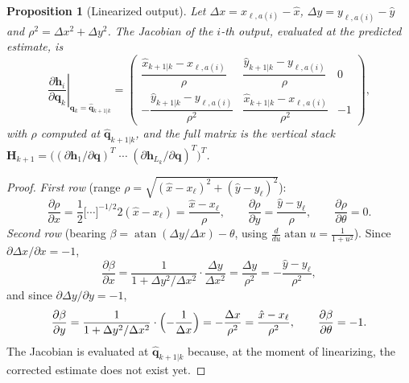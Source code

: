 \documentclass[11pt,a4paper]{article}
\theoremstyle{definition}
\theoremstyle{plain}
\newtheorem{proposition}[definition]{Proposition}
\theoremstyle{remark}
\newcommand{\hq}{\hat{\bm q}}
\begin{document}
\begin{proposition}[Linearized output]
\label{prop:H}
Let $\Delta x=x_{\ell,a(i)}-\hat x$, $\Delta y=y_{\ell,a(i)}-\hat y$ and $\rho^2=\Delta x^2+\Delta y^2$. The Jacobian of the $i$-th output, evaluated at the \emph{predicted} estimate, is
\[
\left.\frac{\partial\bm h_i}{\partial\bm q_k}\right|_{\bm q_k=\hq_{k+1|k}}=
\begin{pmatrix}
\dfrac{\hat x_{k+1|k}-x_{\ell,a(i)}}{\rho} & \dfrac{\hat y_{k+1|k}-y_{\ell,a(i)}}{\rho} & 0\\[10pt]
-\dfrac{\hat y_{k+1|k}-y_{\ell,a(i)}}{\rho^2} & \dfrac{\hat x_{k+1|k}-x_{\ell,a(i)}}{\rho^2} & -1
\end{pmatrix},
\]
with $\rho$ computed at $\hq_{k+1|k}$, and the full matrix is the vertical stack
$\bm H_{k+1}=\bigl((\partial\bm h_1/\partial\bm q)^T\;\cdots\;(\partial\bm h_{L_k}/\partial\bm q)^T\bigr)^T$.
\end{proposition}
\begin{proof}
\emph{First row} (range $\rho=\sqrt{(\hat x-x_\ell)^2+(\hat y-y_\ell)^2}$):
\[
\frac{\partial\rho}{\partial x}=\frac12\bigl[\cdots\bigr]^{-1/2}2(\hat x-x_\ell)=\frac{\hat x-x_\ell}{\rho},\qquad
\frac{\partial\rho}{\partial y}=\frac{\hat y-y_\ell}{\rho},\qquad
\frac{\partial\rho}{\partial\theta}=0 .
\]
\emph{Second row} (bearing $\beta=\operatorname{atan}(\Delta y/\Delta x)-\theta$, using $\tfrac{d}{du}\operatorname{atan}u=\tfrac1{1+u^2}$). Since $\partial\Delta x/\partial x=-1$,
\[
\frac{\partial\beta}{\partial x}=\frac{1}{1+\Delta y^2/\Delta x^2}\cdot\frac{\Delta y}{\Delta x^2}=\frac{\Delta y}{\rho^2}=-\frac{\hat y-y_\ell}{\rho^2},
\]
and since $\partial\Delta y/\partial y=-1$,
\[
\frac{\partial\beta}{\partial y}=\frac{1}{1+\Delta y^2/\Delta x^2}\cdot\Bigl(-\frac{1}{\Delta x}\Bigr)=-\frac{\Delta x}{\rho^2}=\frac{\hat x-x_\ell}{\rho^2},\qquad
\frac{\partial\beta}{\partial\theta}=-1 .
\]
The Jacobian is evaluated at $\hq_{k+1|k}$ because, at the moment of linearizing, the corrected estimate does not exist yet.
\end{proof}
\end{document}

